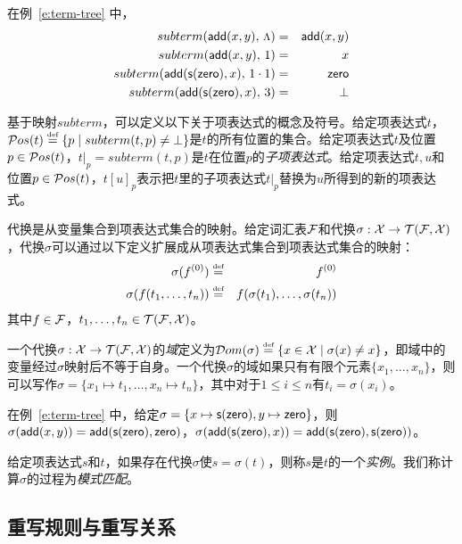 \begin{example}
在例~\ref{e:term-tree} 中，
\begin{eqnarray}
  subterm(\add(x,y),\, \rootp) & = & \add(x,y)  \nonumber \\
  subterm(\add(x,y),\, 1) & = & x \nonumber \\
  subterm(\add(\s(\zero),x),\, 1\cdot 1) & = & \zero  \nonumber \\
  subterm(\add(\s(\zero),x),\, 3) & = & \bot  \nonumber
\end{eqnarray}
\end{example}

基于映射$subterm$，可以定义以下关于项表达式的概念及符号。给定项表达式$t$，$\Pos{t}\defeq \{p\mid subterm(t,p)\not=\bot\}$是$t$的所有位置的集合。给定项表达式$t$及位置$p \in \Pos{t}$，$t|_p = subterm(t,p)$是$t$在位置$p$的\emph{子项表达式}。给定项表达式$t,u$和位置$p\in\Pos{t}$，$t[u]_p$表示把$t$里的子项表达式$t|_p$替换为$u$所得到的新的项表达式。

\begin{definition}[代换]
代换是从变量集合到项表达式集合的映射。给定词汇表$\cF$和代换$\sigma : \cX \ra \TFX$，代换$\sigma$可以通过以下定义扩展成从项表达式集合到项表达式集合的映射：
\begin{eqnarray}
  \sigma(f^{(0)}) & \defeq & f^{(0)}  \nonumber \\
  \sigma(f(t_1,\ldots,t_n)) & \defeq & f(\sigma(t_1),\ldots,\sigma(t_n)) \nonumber
\end{eqnarray}
其中$f\in\cF$，$t_1,\ldots,t_n\in\TFX$。
\end{definition}

一个代换$\sigma : \cX\ra\TFX$的\emph{域}定义为$\Dom{\sigma} \defeq \{x\in\cX \mid \sigma(x)\not= x \}$，即域中的变量经过$\sigma$映射后不等于自身。一个代换$\sigma$的域如果只有有限个元素$\{x_1,\ldots,x_n\}$，则可以写作$\sigma = \{x_1\mapsto t_1, \ldots, x_n\mapsto t_n \}$，其中对于$1\le i \le n$有$t_i = \sigma(x_i)$。

\begin{example}
在例~\ref{e:term-tree} 中，给定$\sigma = \{x\mapsto \s(\zero), y\mapsto \zero\}$，则$\sigma(\add(x,y)) = \add(\s(\zero), \zero)$，$\sigma(\add(\s(\zero), x)) = \add(\s(\zero), \s(\zero))$。
\end{example}

给定项表达式$s$和$t$，如果存在代换$\sigma$使$s=\sigma(t)$，则称$s$是$t$的一个\emph{实例}。我们称计算$\sigma$的过程为\emph{模式匹配}。

\subsection{重写规则与重写关系}

